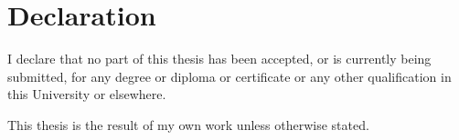\chapter*{Declaration}

I declare that no part of this thesis has been accepted, or is currently being submitted,
for any degree or diploma or certificate or any other qualification in this University or
elsewhere.

\bigskip

\noindent This thesis is the result of my own work unless otherwise stated.
